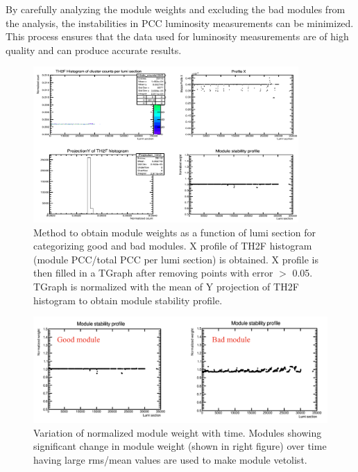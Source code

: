 By carefully analyzing the module weights and excluding the bad modules from the analysis, the instabilities in PCC luminosity measurements can be minimized. This process ensures that the data used for luminosity measurements are of high quality and can produce accurate results.


\begin{figure}[!htp]
\centering
\includegraphics[width=0.9\textwidth]{ashish_thesis/Module_weight.png}
\caption{%
   Method to obtain module weights as a function of lumi section for categorizing good and bad modules. X profile of TH2F histogram (module PCC/total PCC per lumi section) is obtained. X profile is then filled in a TGraph after removing points with error $>$ 0.05. TGraph is normalized with the mean of Y projection of TH2F histogram to obtain module stability profile.
}
\label{fig:mod_weight}
\end{figure}


\begin{figure}[!htp]
\centering
\includegraphics[width=1\textwidth]{ashish_thesis/good_bad_modules.png}
\caption{%
   Variation of normalized module weight with time. Modules showing significant change in module weight (shown in right figure) over time having large rms/mean values are used to make module vetolist.
}
\label{fig:goodbadmodules}
\end{figure}

